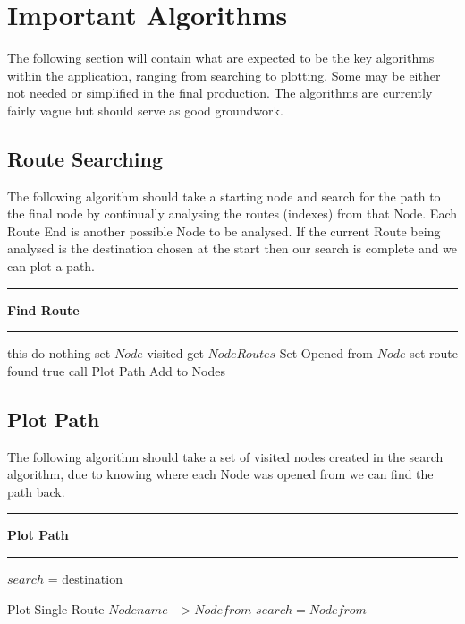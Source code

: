 \section{Important Algorithms}
The following section will contain what are expected to be the key algorithms within the application, ranging from searching to plotting. Some may be either not needed or simplified in the final production. The algorithms are currently fairly vague but should serve as good groundwork. 
\subsection{Route Searching}
The following algorithm should take a starting node and search for the path to the final node by continually analysing the routes (indexes) from that Node. Each Route End is another possible Node to be analysed. If the current Route being analysed is the destination chosen at the start then our search is complete and we can plot a path.  
\vspace{0.3cm}
\hrule
\vspace{0.1cm}
\textbf{Find Route}
\vspace{0.1cm}
\hrule
\vspace{0.1cm}
\begin{algorithmic}[1]
 this
    \State do nothing
\Else
	\State set $Node$ visited
    \State get $Node Routes$
    \State Set Opened from $Node$
    		\State set route found true
    		\State call Plot Path
    	\EndIf
    		\State Add to Nodes
    	\EndIf
    	
    \EndFor
\EndIf
\EndFor
\EndWhile
\end{algorithmic}

\subsection{Plot Path}
The following algorithm should take a set of visited nodes created in the search algorithm, due to knowing where each Node was opened from we can find the path back.
\vspace{0.3cm}
\hrule
\vspace{0.1cm}
\textbf{Plot Path}
\vspace{0.1cm}
\hrule
\vspace{0.1cm}
\begin{algorithmic}[1]
\State$search$ = destination
	
		\State Plot Single Route $Node name -> Node from$
		\State $search = Node from$
	\EndIf
\EndFor
\EndFor
\end{algorithmic}
